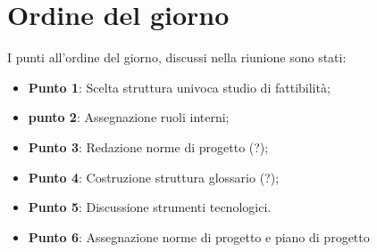 \section{Ordine del giorno}
I punti all'ordine del giorno, discussi nella riunione sono stati:
\begin{itemize}

	\item \textbf{Punto 1}: Scelta struttura univoca studio di fattibilità;
	\item \textbf{punto 2}: Assegnazione ruoli interni; 
	\item \textbf{Punto 3}: Redazione norme di progetto (?);
	\item \textbf{Punto 4}: Costruzione struttura glossario (?); 
	\item \textbf{Punto 5}: Discussione strumenti tecnologici.
	\item \textbf{Punto 6}: Assegnazione norme di progetto e piano di progetto 
\end{itemize}

